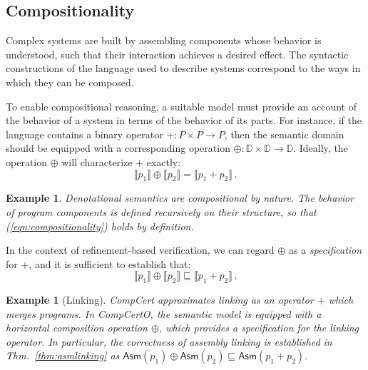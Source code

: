 \documentclass[11pt,oneside,draft]{book}
\newtheorem{example}[theorem]{Example}
\theoremstyle{definition}
\newcommand{\kw}[1]{\ensuremath{ \mathsf{#1} }}
\newcommand{\refby}{\sqsubseteq} %
\begin{document}

\subsection{Compositionality} %

Complex systems are built by assembling components
whose behavior is understood,
such that their interaction achieves a desired effect.
The syntactic constructions of
the language used to describe systems
correspond to the ways in which they can be composed.

To enable compositional reasoning,
a suitable model must provide an account of
the behavior of a system
in terms of the behavior of its parts.
For instance,
if the language contains a binary operator
${+} : P \times P \rightarrow P$,
then the semantic domain should be equipped with
a corresponding operation
${\oplus} : \mathbb{D} \times \mathbb{D} \rightarrow \mathbb{D}$.
Ideally,
the operation $\oplus$
will characterize $+$ exactly:
\begin{equation}
  \llbracket p_1 \rrbracket \oplus \llbracket p_2 \rrbracket
  =
  \llbracket p_1 + p_2 \rrbracket
  \,.
  \label{eqn:compositionality}
\end{equation}

\begin{example}
Denotational semantics are compositional by nature.
The behavior of program components
is defined recursively on their structure,
so that (\ref{eqn:compositionality}) holds \emph{by definition}.
\end{example}

In the context of refinement-based verification,
we can regard $\oplus$ as a \emph{specification} for $+$,
and it is sufficient to establish that:
\begin{equation}
  \llbracket p_1 \rrbracket \oplus \llbracket p_2 \rrbracket
  \refby
  \llbracket p_1 + p_2 \rrbracket \,.
  \label{eqn:compositional-correctness}
\end{equation}

\begin{example}[Linking]
CompCert approximates \emph{linking}
as an operator $+$ which merges programs.
In CompCertO,
the semantic model is equipped with a
\emph{horizontal composition} operation $\oplus$,
which provides a specification for the linking operator.
In particular, the correctness of assembly linking
is established in Thm.~\ref{thm:asmlinking} as
$
  \kw{Asm}(p_1) \oplus \kw{Asm}(p_2) \refby
  \kw{Asm}(p_1 + p_2)
$.
\end{example}
\end{document}
